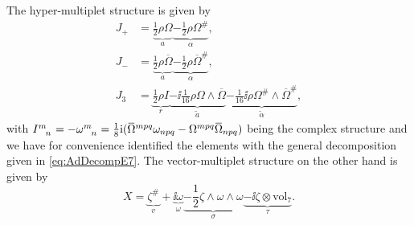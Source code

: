 The hyper-multiplet structure is given by
\begin{equation}\label{eq:HyperMultipletStructureCalabiYau}
    \begin{aligned}
        J_+ &= \underbrace{\frac{1}{2}\rho\Omega}_{a} \underbrace{-\frac{1}{2}\rho\Omega^{\#}}_{\alpha},\\
        J_- &= \underbrace{\frac{1}{2}\rho\overbar{\Omega}}_{a} \underbrace{-\frac{1}{2}\rho\overbar{\Omega}^{\#}}_{\alpha},\\
        J_3 &= \underbrace{\frac{1}{2}\rho I}_{r}\underbrace{-\ii\frac{1}{16}\rho\Omega\wedge\overbar{\Omega}}_{\tilde{a}}\underbrace{-\frac{1}{16}\ii\rho\Omega^{\#}\wedge\overbar{\Omega}^{\#}}_{\tilde{\alpha}},
    \end{aligned}
\end{equation}
with $\tensor{I}{^m_n}=-\tensor{\omega}{^m_n}=\frac{1}{8}\ii (\overbar{\Omega}^{mpq}\omega_{npq}-\Omega^{mpq}\overbar{\Omega}_{npq})$ being the complex structure and we have for convenience identified the elements with the general decomposition given in \eqref{eq:AdDecompE7}. The vector-multiplet structure on the other hand is given by 
\begin{equation}\label{eq:VectorMultipletStructureCalabiYau}
    X = \underbrace{\zeta^{\#}}_{v}+\underbrace{\ii\omega}_{\omega}\underbrace{-\frac{1}{2}\zeta\wedge\omega\wedge\omega}_{\sigma}\underbrace{-\ii\zeta\otimes\text{vol}_7}_{\tau}.
\end{equation}

